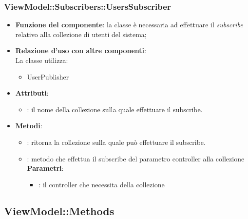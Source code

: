 \subsubsection{ViewModel::Subscribers::UsersSubscriber}
\begin{itemize}
\item\textbf{Funzione del componente}: la classe è necessaria ad effettuare il \emph{subscribe} relativo alla collezione di utenti del sistema;
	\item\textbf{Relazione d'uso con altre componenti}: \\
La classe utilizza:
	\begin{itemize}
		\item UserPublisher
	\end{itemize}
\item\textbf{Attributi}:
	\begin{itemize}
		\item{}: il nome della collezione sulla quale effettuare il subscribe.\\
	\end{itemize}
\item\textbf{Metodi}:
	\begin{itemize}
		\item{}: ritorna la collezione sulla quale può effettuare il subscribe.\\
		\item{}: metodo che effettua il subscribe del parametro controller alla collezione\\
		\textbf{Parametri}:
			\begin{itemize}
				\item{}: il controller che necessita della collezione\\
			\end{itemize}
	\end{itemize}
\end{itemize}

\subsection{ViewModel::Methods}

